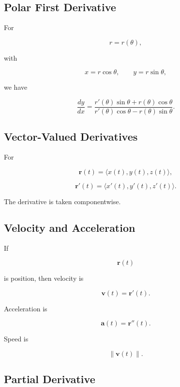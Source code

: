 \subsection{Polar First Derivative}
\label{subsec:polar-first-derivative}

For

\[
r=r(\theta),
\]

with

\[
x=r\cos\theta,
\qquad
y=r\sin\theta,
\]

we have

\[
\boxed{
\frac{dy}{dx}
=
\frac{
r'(\theta)\sin\theta
+
r(\theta)\cos\theta
}{
r'(\theta)\cos\theta
-
r(\theta)\sin\theta
}.
}
\]

\subsection{Vector-Valued Derivatives}
\label{subsec:vector-valued-derivative}

For

\[
\mathbf{r}(t)
=
\langle
x(t),
y(t),
z(t)
\rangle,
\]

\[
\boxed{
\mathbf{r}'(t)
=
\langle
x'(t),
y'(t),
z'(t)
\rangle.
}
\]

The derivative is taken componentwise.

\subsection{Velocity and Acceleration}
\label{subsec:velocity-acceleration-derivative}

If

\[
\mathbf{r}(t)
\]

is position, then velocity is

\[
\boxed{
\mathbf{v}(t)
=
\mathbf{r}'(t).
}
\]

Acceleration is

\[
\boxed{
\mathbf{a}(t)
=
\mathbf{r}''(t).
}
\]

Speed is

\[
\boxed{
\|\mathbf{v}(t)\|.
}
\]

\subsection{Partial Derivative}
\label{subsec:partial-derivative-table-reference}

